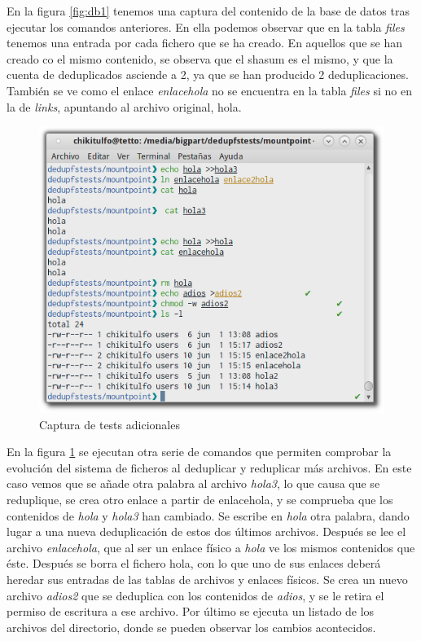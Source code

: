 \documentclass[12pt,a4paper]{article}
\begin{document}
En la figura \ref{fig:db1} tenemos una captura del contenido de la base de datos tras ejecutar los comandos anteriores. En ella podemos observar que en la tabla \emph{files} tenemos una entrada por cada fichero que se ha creado. En aquellos que se han creado co el mismo contenido, se observa que el shasum es el mismo, y que la cuenta de deduplicados asciende a 2, ya que se han producido 2 deduplicaciones. También se ve como el enlace \emph{enlacehola} no se encuentra en la tabla \emph{files} si no en la de \emph{links}, apuntando al archivo original, hola.

\begin{figure}[h!]
  \centering
  \label{fig:test2}
  \includegraphics[width=.6\linewidth]{imagenes/test2}
  \caption{Captura de tests adicionales}
\end{figure}

En la figura \ref{fig:test2} se ejecutan otra serie de comandos que permiten comprobar la evolución del sistema de ficheros al deduplicar y reduplicar más archivos. En este caso vemos que se añade otra palabra al archivo \emph{hola3}, lo que causa que se reduplique, se crea otro enlace a partir de enlacehola, y se comprueba que los contenidos de \emph{hola} y \emph{hola3} han cambiado. Se escribe en \emph{hola} otra palabra, dando lugar a una nueva deduplicación de estos dos últimos archivos. Después se lee el archivo \emph{enlacehola}, que al ser un enlace físico a \emph{hola} ve los mismos contenidos que éste. Después se borra el fichero hola, con lo que uno de sus enlaces deberá heredar sus entradas de las tablas de archivos y enlaces físicos. Se crea un nuevo archivo \emph{adios2} que se deduplica con los contenidos de \emph{adios}, y se le retira el permiso de escritura a ese archivo. Por último se ejecuta un listado de los archivos del directorio, donde se pueden observar los cambios acontecidos.
\end{document}
